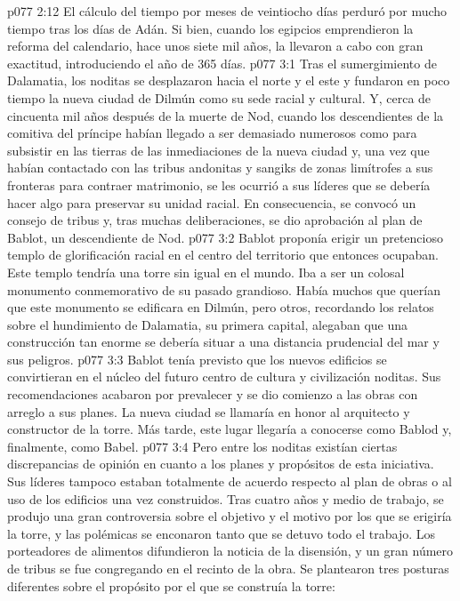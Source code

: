 \vs p077 2:12 El cálculo del tiempo por meses de veintiocho días perduró por mucho tiempo tras los días de Adán. Si bien, cuando los egipcios emprendieron la reforma del calendario, hace unos siete mil años, la llevaron a cabo con gran exactitud, introduciendo el año de 365 días.
\vs p077 3:1 Tras el sumergimiento de Dalamatia, los noditas se desplazaron hacia el norte y el este y fundaron en poco tiempo la nueva ciudad de Dilmún como su sede racial y cultural. Y, cerca de cincuenta mil años después de la muerte de Nod, cuando los descendientes de la comitiva del príncipe habían llegado a ser demasiado numerosos como para subsistir en las tierras de las inmediaciones de la nueva ciudad y, una vez que habían contactado con las tribus andonitas y sangiks de zonas limítrofes a sus fronteras para contraer matrimonio, se les ocurrió a sus líderes que se debería hacer algo para preservar su unidad racial. En consecuencia, se convocó un consejo de tribus y, tras muchas deliberaciones, se dio aprobación al plan de Bablot, un descendiente de Nod.
\vs p077 3:2 Bablot proponía erigir un pretencioso templo de glorificación racial en el centro del territorio que entonces ocupaban. Este templo tendría una torre sin igual en el mundo. Iba a ser un colosal monumento conmemorativo de su pasado grandioso. Había muchos que querían que este monumento se edificara en Dilmún, pero otros, recordando los relatos sobre el hundimiento de Dalamatia, su primera capital, alegaban que una construcción tan enorme se debería situar a una distancia prudencial del mar y sus peligros.
\vs p077 3:3 Bablot tenía previsto que los nuevos edificios se convirtieran en el núcleo del futuro centro de cultura y civilización noditas. Sus recomendaciones acabaron por prevalecer y se dio comienzo a las obras con arreglo a sus planes. La nueva ciudad se llamaría  en honor al arquitecto y constructor de la torre. Más tarde, este lugar llegaría a conocerse como Bablod y, finalmente, como Babel.
\vs p077 3:4 Pero entre los noditas existían ciertas discrepancias de opinión en cuanto a los planes y propósitos de esta iniciativa. Sus líderes tampoco estaban totalmente de acuerdo respecto al plan de obras o al uso de los edificios una vez construidos. Tras cuatro años y medio de trabajo, se produjo una gran controversia sobre el objetivo y el motivo por los que se erigiría la torre, y las polémicas se enconaron tanto que se detuvo todo el trabajo. Los porteadores de alimentos difundieron la noticia de la disensión, y un gran número de tribus se fue congregando en el recinto de la obra. Se plantearon tres posturas diferentes sobre el propósito por el que se construía la torre:
